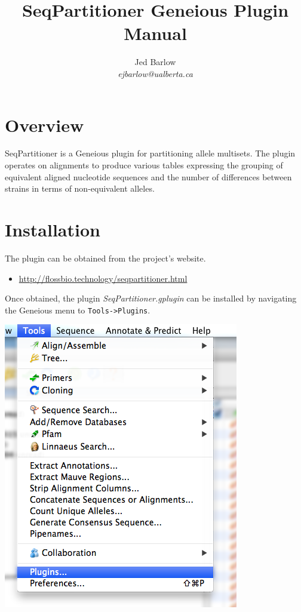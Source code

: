 \documentclass[12pt,letterpaper]{article}
\author{
    Jed Barlow\\
    \textit{ejbarlow@ualberta.ca}
}
\title{SeqPartitioner Geneious Plugin Manual}
\begin{document}
\maketitle

\hfill

\tableofcontents

\newpage
\section{Overview}

SeqPartitioner is a Geneious plugin for partitioning allele multisets.  The
plugin operates on alignments to produce various tables expressing the grouping
of equivalent aligned nucleotide sequences and the number of differences
between strains in terms of non-equivalent alleles.

\section{Installation}
The plugin can be obtained from the project's website.

\begin{itemize}
\item
    \url{http://flossbio.technology/seqpartitioner.html}
\end{itemize}

Once obtained, the plugin \textit{SeqPartitioner.gplugin} can be installed by
navigating the Geneious menu to \texttt{Tools->Plugins}.

\hfill

\includegraphics[resolution=130]{menu_entry_plugins.png}
\end{document}
